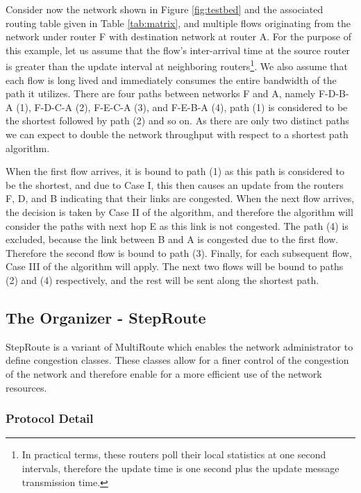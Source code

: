 Consider now the network shown in Figure \ref{fig:testbed} and the associated routing table given in Table \ref{tab:matrix}, and multiple flows originating from the network under router F with destination network at router A. For the purpose of this example, let us assume that the flow's inter-arrival time at the source router is greater than the update interval at neighboring routers\footnote{In practical terms, these routers poll their local statistics at one second intervals, therefore the update time is one second plus the update message transmission time.}. We also assume that each flow is long lived and immediately consumes the entire bandwidth of the path it utilizes. There are four paths between networks F and A, namely F-D-B-A (1), F-D-C-A (2), F-E-C-A (3), and F-E-B-A (4), path (1) is considered to be the shortest followed by path (2) and so on. As there are only two distinct paths we can expect to double the network throughput with respect to a shortest path algorithm.

When the first flow arrives, it is bound to path (1) as this path is considered to be the shortest, and due to Case I, this then causes an update from the routers F, D, and B indicating that their links are congested. When the next flow arrives, the decision is taken by Case II of the algorithm, and therefore the algorithm will consider the paths with next hop E as this link is not congested. The path (4) is excluded, because the link between B and A is congested due to the first flow. Therefore the second flow is bound to path (3). Finally, for each subsequent flow, Case III of the algorithm will apply. The next two flows will be bound to paths (2) and (4) respectively, and the rest will be sent along the shortest path.

\subsection{The Organizer - StepRoute}

StepRoute \cite{SR} is a variant of MultiRoute which enables the network administrator to
define congestion classes. These classes allow for a finer control of the
congestion of the network and therefore enable for a more efficient use of the
network resources.

\subsubsection{Protocol Detail}
\label{sect:SRDetail}


